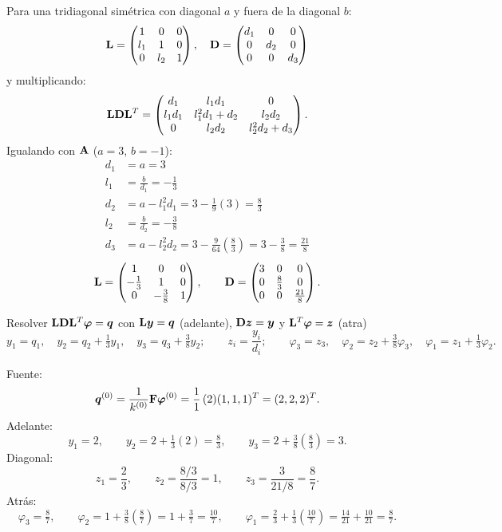 Para una tridiagonal simétrica con diagonal $a$ y fuera de la diagonal $b$:
\[
\mathbf{L} = \begin{pmatrix} 1 & 0 & 0\\ l_1 & 1 & 0\\ 0 & l_2 & 1 \end{pmatrix},\quad
\mathbf{D} = \begin{pmatrix} d_1 & 0 & 0\\ 0 & d_2 & 0\\ 0 & 0 & d_3 \end{pmatrix}
\]
y multiplicando:
\[
\mathbf{L}\mathbf{D}\mathbf{L}^T = \begin{pmatrix} d_1 & l_1 d_1 & 0\\ l_1 d_1 & l_1^2 d_1 + d_2 & l_2 d_2\\
	0 & l_2 d_2 & l_2^2 d_2 + d_3 \end{pmatrix}.
\]
Igualando con $\mathbf{A}$ ($a = 3$, $b = -1$):
\begin{align*}
	d_1 &= a = 3\\
	l_1 &= \frac{b}{d_1} = -\frac13\\
	d_2 &= a - l_1^2 d_1 = 3 - \frac19(3) = \frac83\\
	l_2 &= \frac{b}{d_2} = -\frac38\\
	d_3 &= a - l_2^2 d_2 = 3 - \frac{9}{64}\left(\frac83\right) = 3 - \frac38 = \frac{21}{8}
\end{align*}
\[
\mathbf{L} = \begin{pmatrix} 1 & 0 & 0\\ -\frac13 & 1 & 0\\ 0 & -\frac38 & 1 \end{pmatrix},\qquad
\mathbf{D} = \begin{pmatrix} 3 & 0 & 0\\ 0 & \frac83 & 0\\ 0 & 0 & \frac{21}{8} \end{pmatrix}.
\]

Resolver $\mathbf{L}\mathbf{D}\mathbf{L}^T\bm{\varphi} = \bm{q}$ con
$\mathbf{L}\bm{y} = \bm{q}$ (adelante), $\mathbf{D}\bm{z} = \bm{y}$ y $\mathbf{L}^T\bm{\varphi} = \bm{z}$ (atra)
\[
y_1 = q_1,\quad y_2 = q_2 + \tfrac13 y_1,\quad y_3 = q_3 + \tfrac38 y_2;\qquad
z_i = \frac{y_i}{d_i};\qquad
\varphi_3 = z_3,\quad \varphi_2 = z_2 + \tfrac38\varphi_3,\quad \varphi_1 = z_1 + \tfrac13\varphi_2 .
\]

Fuente:
\[
\bm{q}^{(0)} = \frac{1}{k^{(0)}}\mathbf{F}\bm{\varphi}^{(0)} = \frac11\,(2)(1, 1, 1)^T = (2, 2, 2)^T .
\]
Adelante:
\[
y_1 = 2,\qquad y_2 = 2 + \tfrac13(2) = \tfrac83,\qquad y_3 = 2 + \tfrac38\left(\tfrac83\right) = 3 .
\]
Diagonal:
\[
z_1 = \frac{2}{3},\qquad z_2 = \frac{8/3}{8/3} = 1,\qquad z_3 = \frac{3}{21/8} = \frac{8}{7} .
\]
Atrás:
\[
\varphi_3 = \tfrac87,\qquad
\varphi_2 = 1 + \tfrac38\left(\tfrac87\right) = 1 + \tfrac37 = \tfrac{10}{7},\qquad
\varphi_1 = \tfrac23 + \tfrac13\left(\tfrac{10}{7}\right) = \tfrac{14}{21} + \tfrac{10}{21} = \tfrac{8}{7} .
\]

